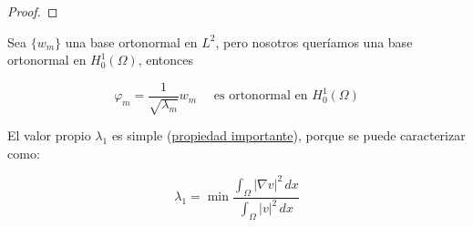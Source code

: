 \begin{teo}
\begin{proof}







\end{proof}
\end{teo}

\begin{observacion}
    Sea $\{w_m\}$ una base ortonormal en $L^2$, pero nosotros queríamos una base ortonormal en $H_0^1(\Omega)$, entonces
    
    \begin{equation*}
         \varphi_m = \frac{1}{\sqrt{\lambda_m}} w_m \quad \text{ es ortonormal en } H_0^1(\Omega)
    \end{equation*}
\end{observacion}


\begin{observacion}
    El valor propio $\lambda_1$ es simple (\underline{propiedad importante}), porque se puede caracterizar como:

    $$\lambda_1 = \min \frac{\int_{\Omega} |\nabla v|^2 \, dx}{\int_{\Omega} |v|^2 \, dx}$$
\end{observacion}

